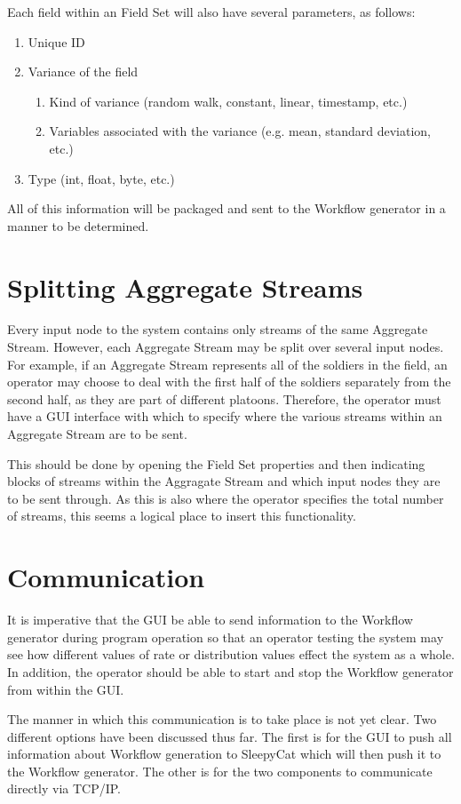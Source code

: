 \documentclass[a4paper,12pt]{article}
\begin{document}
Each field within an Field Set will also have several parameters, as
follows:

\begin{enumerate}
\item Unique ID
\item Variance of the field
\begin{enumerate}
\item Kind of variance (random walk, constant, linear, timestamp, etc.)
\item Variables associated with the variance (e.g. mean, standard deviation,
etc.)
\end{enumerate}
\item Type (int, float, byte, etc.)
\end{enumerate}

All of this information will be packaged and sent to the Workflow generator in a
manner to be determined.

\section*{Splitting Aggregate Streams}

Every input node to the system contains only streams of the same Aggregate
Stream. However, each Aggregate Stream may be split over several input nodes. 
For example, if an Aggregate Stream represents all of the soldiers in the field,
an operator may choose to deal with the first half of the soldiers separately 
from the second half, as they are part of different platoons. Therefore, the 
operator must have a GUI interface with which to specify where the various 
streams within an Aggregate Stream are to be sent.

This should be done by opening the Field Set properties and then indicating
blocks of streams within the Aggragate Stream and which input nodes they are to
be sent through. As this is also where the operator specifies the total number
of streams, this seems a logical place to insert this functionality.

\section*{Communication}

It is imperative that the GUI be able to send information to the Workflow
generator during program operation so that an operator testing the system may
see how different values of rate or distribution values effect the system as a
whole. In addition, the operator should be able to start and stop the Workflow
generator from within the GUI.

The manner in which this communication is to take place is not yet clear. Two
different options have been discussed thus far. The first is for the GUI to
push all information about Workflow generation to SleepyCat which will then push
it to the Workflow generator. The other is for the two components to communicate
directly via TCP/IP.
\end{document}
